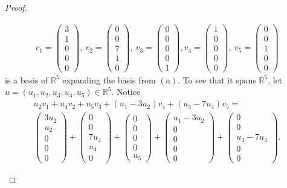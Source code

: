 \documentclass{extarticle}
\newcommand{\R}{\mathbb{R}}
\begin{document}
\begin{proof}
\begin{enumerate}[(a)]
\begin{align*}
v_1 = \begin{pmatrix}3\\1\\0\\0\\0\end{pmatrix}, ~ v_2 = \begin{pmatrix}0\\0\\7\\1\\0\end{pmatrix}, ~ v_3 = \begin{pmatrix}0\\0\\0\\0\\1\end{pmatrix}, v_4 = \begin{pmatrix}1\\0\\0\\0\\0\end{pmatrix}, ~v_5 = \begin{pmatrix}0\\0\\1\\0\\0\end{pmatrix}
\end{align*}
is a basis of $\R^5$ expanding the basis from $(a)$.  To see that it spans $\R^5$, let $u=(u_1,u_2,u_3,u_4,u_5)\in\R^5$.  Notice 
\begin{multline*}
u_2v_1 + u_4v_2 + u_5v_3+ (u_1 - 3u_2)v_4 + (u_3 - 7u_4)v_5 = \\
\begin{pmatrix} 3u_2 \\ u_2 \\ 0 \\ 0\\ 0 \end{pmatrix} + \begin{pmatrix} 0 \\ 0 \\ 7u_4 \\ u_4 \\ 0 \end{pmatrix} + \begin{pmatrix} 0 \\ 0 \\ 0 \\ 0 \\ u_5 \end{pmatrix} + \begin{pmatrix} u_1 -3u_2\\ 0 \\ 0 \\ 0 \\ 0 \end{pmatrix} + \begin{pmatrix} 0 \\ 0 \\ u_3 - 7u_4 \\ 0 \\ 0 \end{pmatrix}.

\end{multline*}
\end{enumerate}
\end{proof}
\end{document}
